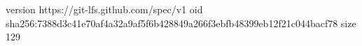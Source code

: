 version https://git-lfs.github.com/spec/v1
oid sha256:7388d3c41e70af4a32a9af5f6b428849a266f3ebfb48399eb12f21c044bacf78
size 129
